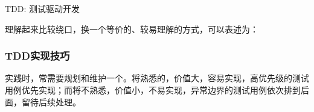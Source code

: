 \begin{content}
\begin{episode}{TDD: 测试驱动开发}
\begin{content}
\begin{enum}
\end{enum}

理解起来比较绕口，换一个等价的、较易理解的方式，可以表述为：

\begin{enum}
\end{enum}

\subsubsection{TDD实现技巧}

实践时，常需要规划和维护一个。将熟悉的，价值大，容易实现，高优先级的测试用例优先实现；而将不熟悉，价值小，不易实现，异常边界的测试用例依次排到后面，留待后续处理。

\begin{enum}
\end{enum}

\end{content}
\end{episode}


\end{content}

